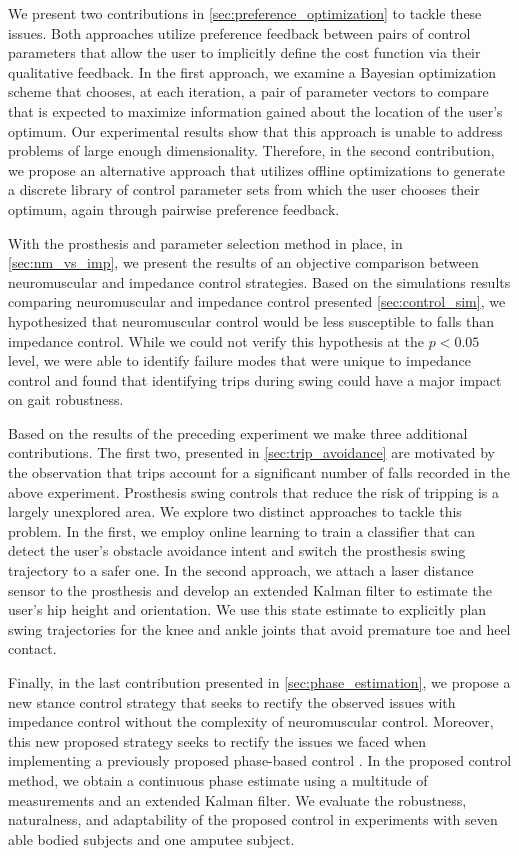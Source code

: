 We present two contributions in \cref{sec:preference_optimization} to tackle
these issues. Both approaches utilize preference feedback between pairs of
control parameters that allow the user to implicitly define the cost function
via their qualitative feedback. In the first approach, we examine a Bayesian
optimization scheme that chooses, at each iteration, a pair of parameter vectors
to compare that is expected to maximize information gained about the location of
the user's optimum. Our experimental results show that this approach is unable
to address problems of large enough dimensionality. Therefore, in the second
contribution, we propose an alternative approach that utilizes offline
optimizations to generate a discrete library of control parameter sets from
which the user chooses their optimum, again through pairwise preference
feedback.

With the prosthesis and parameter selection method in place, in
\cref{sec:nm_vs_imp}, we present the results of an objective comparison between
neuromuscular and impedance control strategies. Based on the simulations results
comparing neuromuscular and impedance control presented \cref{sec:control_sim},
we hypothesized that neuromuscular control would be less susceptible to falls
than impedance control. While we could not verify this hypothesis at the $p <
0.05$ level, we were able to identify failure modes that were unique to
impedance control and found that identifying trips during swing could have a
major impact on gait robustness.

Based on the results of the preceding experiment we make three additional
contributions. The first two, presented in \cref{sec:trip_avoidance} are
motivated by the observation that trips account for a significant number of
falls recorded in the above experiment. Prosthesis swing controls that reduce
the risk of tripping is a largely unexplored area. We explore two distinct
approaches to tackle this problem. In the first, we employ online learning to
train a classifier that can detect the user's obstacle avoidance intent and
switch the prosthesis swing trajectory to a safer one. In the second approach,
we attach a laser distance sensor to the prosthesis and develop an extended
Kalman filter to estimate the user's hip height and orientation. We use this
state estimate to explicitly plan swing trajectories for the knee and ankle
joints that avoid premature toe and heel contact.

Finally, in the last contribution presented in \cref{sec:phase_estimation}, we
propose a new stance control strategy that seeks to rectify the observed issues
with impedance control without the complexity of neuromuscular control.
Moreover, this new proposed strategy seeks to rectify the issues we faced when
implementing a previously proposed phase-based control
\citep{quintero2016preliminary}. In the proposed control method, we obtain a
continuous phase estimate using a multitude of measurements and an extended
Kalman filter. We evaluate the robustness, naturalness, and adaptability of the
proposed control in experiments with seven able bodied subjects and one amputee
subject.

